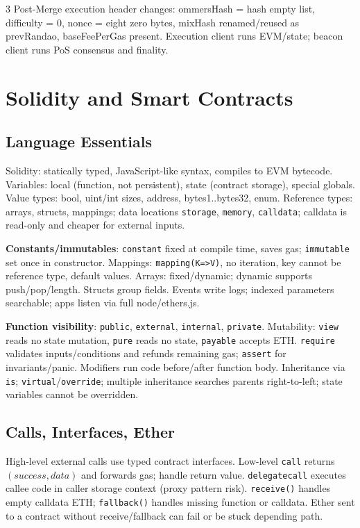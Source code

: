 \documentclass[8pt]{extarticle}
\newcommand{\term}[1]{\textbf{#1}}
\begin{document}
\begin{multicols*}{3}
Post-Merge execution header changes: ommersHash = hash empty list, difficulty = 0, nonce = eight zero bytes, mixHash renamed/reused as prevRandao, baseFeePerGas present. Execution client runs EVM/state; beacon client runs PoS consensus and finality.

\section{Solidity and Smart Contracts}
\subsection{Language Essentials}
Solidity: statically typed, JavaScript-like syntax, compiles to EVM bytecode. Variables: local (function, not persistent), state (contract storage), special globals. Value types: bool, uint/int sizes, address, bytes1..bytes32, enum. Reference types: arrays, structs, mappings; data locations \texttt{storage}, \texttt{memory}, \texttt{calldata}; calldata is read-only and cheaper for external inputs.

\term{Constants/immutables}: \texttt{constant} fixed at compile time, saves gas; \texttt{immutable} set once in constructor. Mappings: \texttt{mapping(K=>V)}, no iteration, key cannot be reference type, default values. Arrays: fixed/dynamic; dynamic supports push/pop/length. Structs group fields. Events write logs; indexed parameters searchable; apps listen via full node/ethers.js.

\term{Function visibility}: \texttt{public}, \texttt{external}, \texttt{internal}, \texttt{private}. Mutability: \texttt{view} reads no state mutation, \texttt{pure} reads no state, \texttt{payable} accepts ETH. \texttt{require} validates inputs/conditions and refunds remaining gas; \texttt{assert} for invariants/panic. Modifiers run code before/after function body. Inheritance via \texttt{is}; \texttt{virtual}/\texttt{override}; multiple inheritance searches parents right-to-left; state variables cannot be overridden.

\subsection{Calls, Interfaces, Ether}
High-level external calls use typed contract interfaces. Low-level \texttt{call} returns $(success,data)$ and forwards gas; handle return value. \texttt{delegatecall} executes callee code in caller storage context (proxy pattern risk). \texttt{receive()} handles empty calldata ETH; \texttt{fallback()} handles missing function or calldata. Ether sent to a contract without receive/fallback can fail or be stuck depending path.


\end{multicols*}
\end{document}
